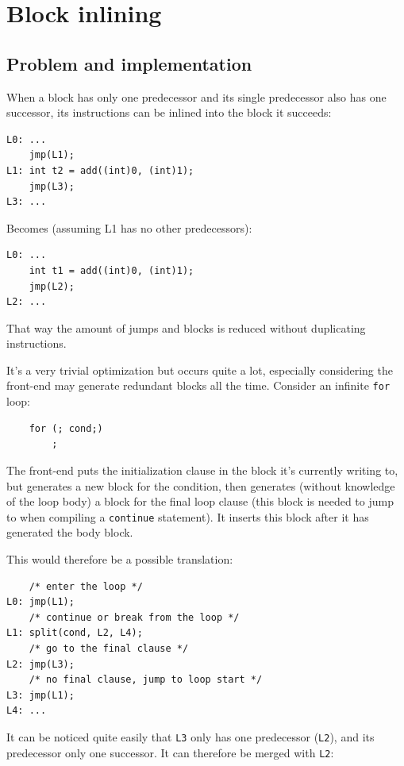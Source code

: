 \documentclass[12pt, a4paper]{article}
\begin{document}
\section{Block inlining}
\subsection{Problem and implementation}
When a block has only one predecessor and its single predecessor
also has one successor, its instructions can be inlined into the block it succeeds:

\begin{lstlisting}
L0:	...
	jmp(L1);
L1:	int t2 = add((int)0, (int)1);
	jmp(L3);
L3:	...
\end{lstlisting}

Becomes (assuming L1 has no other predecessors):

\begin{lstlisting}
L0:	...
	int t1 = add((int)0, (int)1);
	jmp(L2);
L2:	...
\end{lstlisting}

That way the amount of jumps and blocks is reduced without duplicating instructions.

It's a very trivial optimization but occurs quite a lot, especially considering
the front-end may generate redundant blocks all the time. Consider an infinite
\verb+for+ loop:

\begin{lstlisting}
	for (; cond;)
		;
\end{lstlisting}

The front-end puts the initialization clause in the block it's currently writing
to, but generates a new block for the condition, then generates (without knowledge
of the loop body) a block for the final loop clause (this block is needed to jump
to when compiling a \verb+continue+ statement). It inserts this block after
it has generated the body block.

This would therefore be a possible translation:

\begin{lstlisting}
	/* enter the loop */
L0:	jmp(L1);
	/* continue or break from the loop */
L1:	split(cond, L2, L4);
	/* go to the final clause */
L2:	jmp(L3);
	/* no final clause, jump to loop start */
L3:	jmp(L1);
L4:	...
\end{lstlisting}

It can be noticed quite easily that \verb+L3+ only has one predecessor (\verb+L2+), and its
predecessor only one successor. It can therefore be merged with \verb+L2+:
\end{document}
